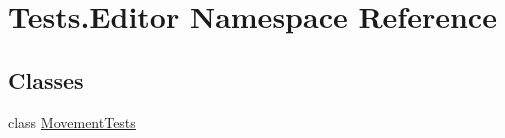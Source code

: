 \hypertarget{namespace_tests_1_1_editor}{}\section{Tests.\+Editor Namespace Reference}
\label{namespace_tests_1_1_editor}
\subsection*{Classes}
\begin{DoxyCompactItemize}
\item 
class \mbox{\hyperlink{class_tests_1_1_editor_1_1_movement_tests}{Movement\+Tests}}
\end{DoxyCompactItemize}
